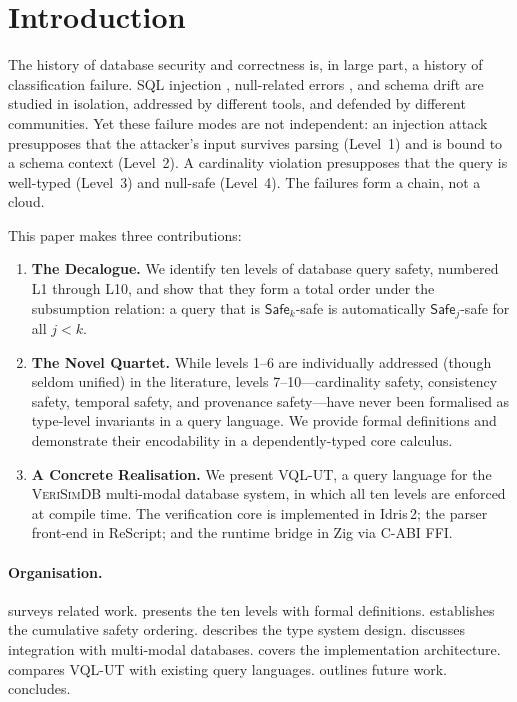 \documentclass[11pt,a4paper]{article}
\newcommand{\VQL}{\textsc{VQL-UT}}
\newcommand{\VeriSimDB}{\textsc{VeriSimDB}}
\newcommand{\LevelN}[1]{\textsf{L#1}}
\newcommand{\Safe}[1]{\ensuremath{\mathsf{Safe}_{#1}}}
\begin{document}
\section{Introduction}\label{sec:intro}

The history of database security and correctness is, in large part, a
history of classification failure.  SQL injection
\citep{halfond2006classification}, null-related errors
\citep{hoare2009null}, and schema drift
\citep{curino2008automating} are studied in isolation, addressed by
different tools, and defended by different communities.  Yet these
failure modes are not independent: an injection attack presupposes
that the attacker's input survives parsing (Level~1) and is bound to a
schema context (Level~2).  A cardinality violation presupposes that the
query is well-typed (Level~3) and null-safe (Level~4).  The failures
form a chain, not a cloud.

This paper makes three contributions:

\begin{enumerate}[label=(\roman*)]
  \item \textbf{The Decalogue.}  We identify ten levels of database
    query safety, numbered \LevelN{1} through \LevelN{10}, and show
    that they form a total order under the subsumption relation: a
    query that is \Safe{k}-safe is automatically \Safe{j}-safe for all
    $j < k$.

  \item \textbf{The Novel Quartet.}  While levels 1--6 are
    individually addressed (though seldom unified) in the literature,
    levels 7--10---cardinality safety, consistency safety, temporal
    safety, and provenance safety---have never been formalised as
    type-level invariants in a query language.  We provide formal
    definitions and demonstrate their encodability in a dependently-typed
    core calculus.

  \item \textbf{A Concrete Realisation.}  We present \VQL{}, a query
    language for the \VeriSimDB{} multi-modal database system, in which
    all ten levels are enforced at compile time.  The verification core
    is implemented in Idris\,2; the parser front-end in ReScript; and
    the runtime bridge in Zig via C-ABI FFI.
\end{enumerate}

\paragraph{Organisation.}
 surveys related work.
 presents the ten levels with formal definitions.
 establishes the cumulative safety ordering.
 describes the type system design.
 discusses integration with multi-modal databases.
 covers the implementation architecture.
 compares \VQL{} with existing query languages.
 outlines future work.
 concludes.
\end{document}

